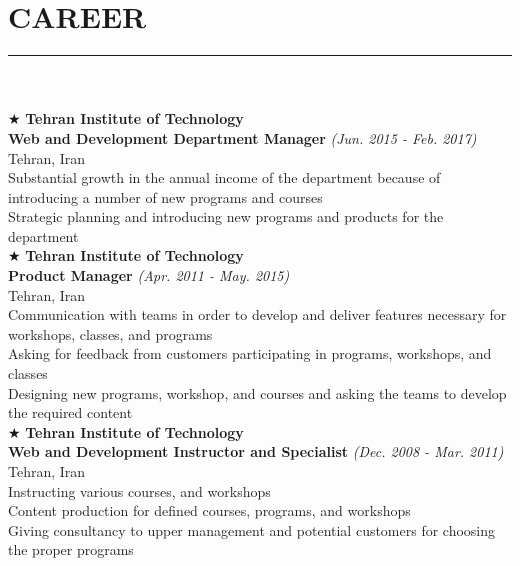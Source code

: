 \documentclass[10pt,a4paper]{article}
\begin{document}
\section{CAREER}
\noindent\rule {18.0cm}{0.2pt} \\ \\
$\bigstar$ \hspace{0.1cm} \large \textbf{Tehran Institute of Technology} \\
\indent \small \textbf{Web and Development Department Manager} \textsl{(Jun. 2015 - Feb. 2017)} \\
\indent \textnormal{Tehran, Iran} \\
\indent \textbullet \hspace{0.05cm} Substantial growth in the annual income of the department because of introducing a number of new programs and courses \\
\indent \textbullet \hspace{0.05cm} Strategic planning and introducing new programs and products for the department \\

\noindent $\bigstar$ \hspace{0.1cm} \large \textbf{Tehran Institute of Technology} \\
\indent \small \textbf{Product Manager} \textsl{(Apr. 2011 - May. 2015)} \\
\indent \textnormal{Tehran, Iran} \\
\indent \textbullet \hspace{0.05cm} Communication with teams in order to develop and deliver features necessary for workshops, classes, and programs \\
\indent \textbullet \hspace{0.05cm} Asking for feedback from customers participating in programs, workshops, and classes \\
\indent \textbullet \hspace{0.05cm} Designing new programs, workshop, and courses and asking the teams to develop the required content  \\

\noindent $\bigstar$ \hspace{0.1cm} \large \textbf{Tehran Institute of Technology} \\
\indent \small \textbf{Web and Development Instructor and Specialist} \textsl{(Dec. 2008 - Mar. 2011)} \\
\indent \textnormal{Tehran, Iran} \\
\indent \textbullet \hspace{0.05cm} Instructing various courses, and workshops \\
\indent \textbullet \hspace{0.05cm} Content production for defined courses, programs, and workshops \\
\indent \textbullet \hspace{0.05cm} Giving consultancy to upper management and potential customers for choosing the proper programs \\
    
\end{document}
